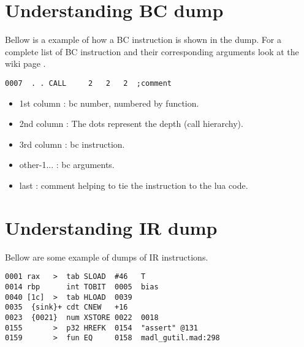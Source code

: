 
\section{Understanding BC dump}
\label{Sec:dump-bc}

Bellow is a example of how a BC instruction is shown in the dump. For a complete
list of BC instruction and their corresponding arguments look at the wiki page
\cite{luajit-bc}.
\begin{verbatim}
0007  . . CALL     2   2   2  ;comment
\end{verbatim}
\begin{itemize}
  \item 1st column : bc number, numbered by function.
  \item 2nd column : The dots represent the depth (call hierarchy).
  \item 3rd column : bc instruction.
  \item other-1... : bc arguments.
  \item last       : comment helping to tie the instruction to the lua code.
\end{itemize}


\section{Understanding IR dump}
\label{Sec:dump-ir}

Bellow are some example of dumps of IR instructions.
\begin{verbatim}
0001 rax   >  tab SLOAD  #46   T
0014 rbp      int TOBIT  0005  bias
0040 [1c]  >  tab HLOAD  0039
0035  {sink}+ cdt CNEW   +16
0023  {0021}  num XSTORE 0022  0018
0155       >  p32 HREFK  0154  "assert" @131
0159       >  fun EQ     0158  madl_gutil.mad:298
\end{verbatim}

